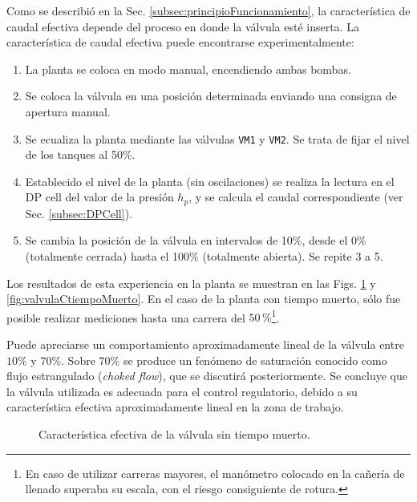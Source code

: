 Como se describió en la Sec. \ref{subsec:principioFuncionamiento}, la
característica de caudal efectiva depende del proceso en donde la válvula esté
inserta. La característica de caudal efectiva puede encontrarse
experimentalmente:
\begin{enumerate}
 \item La planta se coloca en modo manual, encendiendo ambas bombas.
 \item Se coloca la válvula en una posición determinada enviando una consigna
de apertura manual.
 \item Se ecualiza la planta mediante las válvulas \verb|VM1| y \verb|VM2|. Se
trata de fijar el nivel de los tanques al 50\%.
 \item Establecido el nivel de la planta (sin oscilaciones) se realiza la
lectura en el DP cell del valor de la presión $h_p$,
y se calcula el caudal correspondiente (ver Sec. \ref{subsec:DPCell}).
 \item Se cambia la posición de la válvula en intervalos de
 10\%, desde el 0\% (totalmente cerrada) hasta el 100\% (totalmente abierta).
Se repite 3 a 5.
\end{enumerate}

Los resultados de esta experiencia en la planta se muestran en las Figs.
\ref{fig:valvulaStiempoMuerto} y \ref{fig:valvulaCtiempoMuerto}.
En el caso de la planta con tiempo muerto, sólo fue posible realizar mediciones
hasta una carrera del $50\,\%$\footnote{En caso de utilizar carreras mayores,
el manómetro colocado en la cañería de llenado superaba su escala, con el
riesgo consiguiente de rotura.}.

Puede apreciarse un comportamiento aproximadamente lineal de la válvula entre
$10\%$ y $70\%$.
Sobre $70\%$  se produce un fenómeno de saturación conocido como flujo
estrangulado (\emph{choked flow}), que se discutirá posteriormente.
Se concluye que la válvula utilizada es adecuada para el
control regulatorio, debido a su característica efectiva aproximadamente lineal
en la zona de trabajo.

\begin{figure}[ht]
  \centering
\caption{Característica efectiva de la válvula sin tiempo muerto.}
\label{fig:valvulaStiempoMuerto}
\end{figure}

